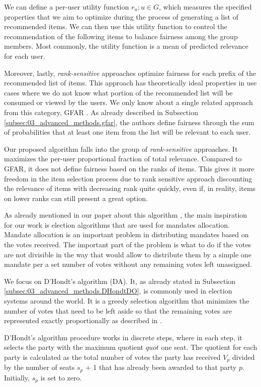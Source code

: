 We can define a per-user utility function $r_u; u \in G$, which measures the specified properties that we aim to optimize during the process of generating a list of recommended items. We can then use this utility function to control the recommendation of the following items to balance fairness among the group members. Most commonly, the utility function is a mean of predicted relevance for each user.

Moreover, lastly, \textit{rank-sensitive} approaches optimize fairness for each prefix of the recommended list of items. This approach has theoretically ideal properties in use cases where we do not know what portion of the recommended list will be consumed or viewed by the users. We only know about a single related approach from this category, GFAR \cite{GFAR-kaya2020}. As already described in Subsection \ref{subsec:03_advanced_methods.gfar}, the authors define fairness through the sum of probabilities that at least one item from the list will be relevant to each user.

Our proposed algorithm falls into the group of \textit{rank-sensitive} approaches. It maximizes the per-user proportional fraction of total relevance. Compared to GFAR, it does not define fairness based on the ranks of items. This gives it more freedom in the item selection process due to rank sensitive approach discounting the relevance of items with decreasing rank quite quickly, even if, in reality, items on lower ranks can still present a great option.

As already mentioned in our paper about this algorithm \cite{our_ep_fuzz_da}, the main inspiration for our work is election algorithms that are used for mandates allocation.
Mandate allocation is an important problem in distributing mandates based on the votes received. The important part of the problem is what to do if the votes are not divisible in the way that would allow to distribute them by a simple one mandate per a set number of votes without any remaining votes left unassigned.

We focus on D'Hondt's algorithm (DA). It, as already stated in Subsection \ref{subsec:03_advanced_methods.DHondtDO}, is commonly used in election systems around the world. It is a greedy selection algorithm that minimizes the number of votes that need to be left aside so that the remaining votes are represented exactly proportionally as described in \cite{wiki:dhondt_method}.

D'Hondt's algorithm procedure works in discrete steps, where in each step, it selects the party with the maximum quotient $quot$ one seat. The quotient for each party is calculated as the total number of votes the party has received $V_p$ divided by the number of seats $s_p$ + 1 that has already been awarded to that party $p$. Initially, $s_p$ is set to zero.

